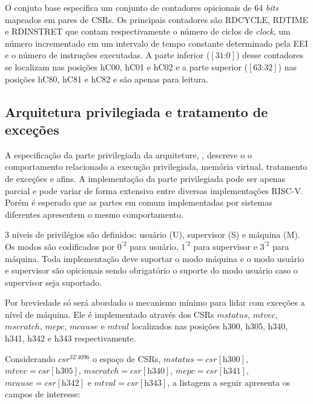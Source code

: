   O conjuto base especifica um conjunto de contadores opicionais de 64 \emph{bits} mapeados em pares de CSRs.
  Os principais contadores são RDCYCLE, RDTIME e RDINSTRET que contam respectivamente o número de ciclos 
  de \emph{clock}, um número incrementado em um intervalo de tempo constante determinado pela EEI e o número de 
  instruções executadas. A parte inferior ($[31\text{:}0]$) desse contadores se localizam nas posições
  hC00, hC01 e hC02 e a parte superior ($[63\text{:}32]$) nas posições hC80, hC81 e hC82 e são apenas para leitura.

\subsection{Arquitetura privilegiada e tratamento de exceções}
\label{sec:excep}

  A especificação da parte privilegiada da arquiteture, \cite{RVS2}, descreve o o comportamento relacionado
  a execução privilegiada, memória virtual, tratamento de exceções e afins. A implementação da parte privilegiada 
  pode ser apenas parcial e pode variar de forma extensiva entre diversas implementações RISC-V. Porém é
  esperado que as partes em comum implementadas por sistemas diferentes apresentem o mesmo comportamento.

  3 níveis de privilégios são definidos: usuário (U), supervisor (S) e máquina (M). Os modos são codificados por
  $0^{'2}$ para usuário, $1^{'2}$ para supervisor e $3^{'2}$ para máquina. Toda implementação deve suportar o modo
  máquina e o modo usuário e supervisor são opicionais sendo obrigatório o suporte do modo usuário caso o supervisor
  seja suportado.

  Por breviedade só será abordado o mecanismo mínimo para lidar com exceções a nível de máquina.
  Ele é implementado através dos CSRs $mstatus$, $mtvec$, $mscratch$, $mepc$, $mcause$ e $mtval$ localizados nas
  posições h300, h305, h340, h341, h342 e h343 respectivamente.

  Considerando $csr^{32'4096}$ o espaço de CSRs, $mstatus = csr[\text{h300}]$,
  $mtvec = csr[\text{h305}]$, 
  $mscratch = csr[\text{h340}]$, 
  $mepc = csr[\text{h341}]$, 
  $mcause = csr[\text{h342}]$ e
  $mtval = csr[\text{h343}]$, a listagem a seguir apresenta os campos de interesse:

